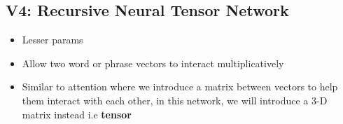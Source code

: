 \documentclass[a4paper]{article}
\begin{document}
\subsection{V4: Recursive Neural Tensor Network}
\begin{itemize}
    \item Lesser params
    \item Allow two word or phrase vectors to interact multiplicatively
    \item Similar to attention where we introduce a matrix between vectors to help them interact with each other, in this network, we will introduce a 3-D matrix instead i.e \textbf{tensor}  
\end{itemize}
\end{document}
